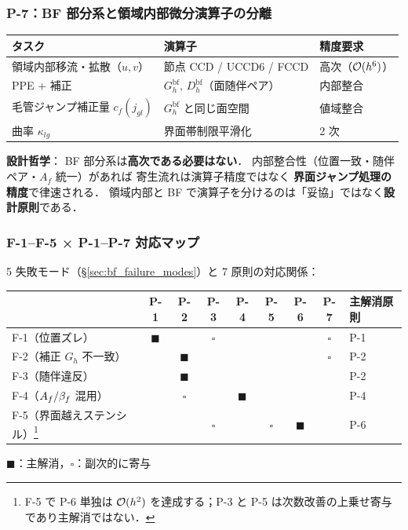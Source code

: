 \subsubsection{P-7：BF 部分系と領域内部微分演算子の分離}
\label{sec:bf_p7_separation}

\begin{center}
\begin{tabular}{@{}lll@{}}
\hline
タスク & 演算子 & 精度要求 \\
\hline
領域内部移流・拡散（$u,v$）& 節点 CCD / UCCD6 / FCCD & 高次（$\mathcal{O}(h^6)$） \\
PPE + 補正 & $G_h^\text{bf},\,D_h^\text{bf}$（面随伴ペア）& 内部整合 \\
毛管ジャンプ補正量 $c_f(j_{gl})$ & $G_h^\text{bf}$ と同じ面空間 & 値域整合 \\
曲率 $\kappa_{lg}$ & 界面帯制限平滑化 & 2 次 \\
\hline
\end{tabular}
\end{center}

\noindent\textbf{設計哲学}：
BF 部分系は\textbf{高次である必要はない}．
内部整合性（位置一致・随伴ペア・$A_f$ 統一）があれば
寄生流れは演算子精度ではなく
\textbf{界面ジャンプ処理の精度}で律速される．
領域内部と BF で演算子を分けるのは「妥協」ではなく\textbf{設計原則}である．

\subsubsection{F-1--F-5 × P-1--P-7 対応マップ}
\label{sec:bf_failure_principle_map}

5 失敗モード（§\ref{sec:bf_failure_modes}）と 7 原則の対応関係：
\begin{center}
\renewcommand{\arraystretch}{\PaperTableArrayStretch}
\begin{tabular}{@{}lcccccccl@{}}
\hline
 & P-1 & P-2 & P-3 & P-4 & P-5 & P-6 & P-7 & 主解消原則 \\
\hline
F-1（位置ズレ）              & $\blacksquare$ & & $\square$ & & & & $\square$ & P-1 \\
F-2（補正 $G_h$ 不一致）      & & $\blacksquare$ & & & & & $\square$ & P-2 \\
F-3（随伴違反）              & & $\blacksquare$ & & & & & & P-2 \\
F-4（$A_f/\beta_{f}$ 混用）     & & $\square$ & & $\blacksquare$ & & & & P-4 \\
F-5（界面越えステンシル）\footnote{F-5 で P-6 単独は \(\mathcal{O}(h^2)\) を達成する；P-3 と P-5 は次数改善の上乗せ寄与であり主解消ではない．}   & & & $\square$ & & $\square$ & $\blacksquare$ & & P-6 \\
\hline
\end{tabular}

{\footnotesize $\blacksquare$：主解消，$\square$：副次的に寄与}
\end{center}

